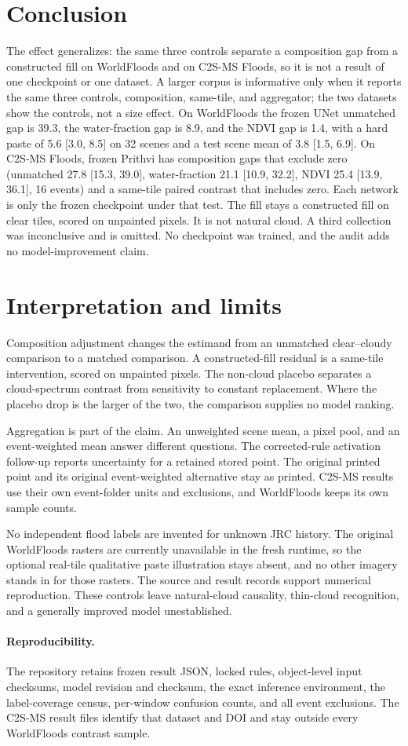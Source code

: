 \section{Conclusion}
The effect generalizes: the same three controls separate a composition gap from a constructed fill on WorldFloods and on C2S-MS Floods, so it is not a result of one checkpoint or one dataset.
A larger corpus is informative only when it reports the same three controls, composition, same-tile, and aggregator; the two datasets show the controls, not a size effect.
On WorldFloods the frozen UNet unmatched gap is 39.3, the water-fraction gap is 8.9, and the NDVI gap is 1.4, with a hard paste of 5.6 [3.0, 8.5] on 32 scenes and a test scene mean of 3.8 [1.5, 6.9].
On C2S-MS Floods, frozen Prithvi has composition gaps that exclude zero (unmatched 27.8 [15.3, 39.0], water-fraction 21.1 [10.9, 32.2], NDVI 25.4 [13.9, 36.1], 16 events) and a same-tile paired contrast that includes zero.
Each network is only the frozen checkpoint under that test.
The fill stays a constructed fill on clear tiles, scored on unpainted pixels.
It is not natural cloud.
A third collection was inconclusive and is omitted.
No checkpoint was trained, and the audit adds no model-improvement claim.

\section{Interpretation and limits}
Composition adjustment changes the estimand from an unmatched clear--cloudy comparison to a matched comparison.
A constructed-fill residual is a same-tile intervention, scored on unpainted pixels.
The non-cloud placebo separates a cloud-spectrum contrast from sensitivity to constant replacement.
Where the placebo drop is the larger of the two, the comparison supplies no model ranking.

Aggregation is part of the claim.
An unweighted scene mean, a pixel pool, and an event-weighted mean answer different questions.
The corrected-rule activation follow-up reports uncertainty for a retained stored point.
The original printed point and its original event-weighted alternative stay as printed.
C2S-MS results use their own event-folder units and exclusions, and WorldFloods keeps its own sample counts.

No independent flood labels are invented for unknown JRC history.
The original WorldFloods rasters are currently unavailable in the fresh runtime, so the optional real-tile qualitative paste illustration stays absent, and no other imagery stands in for those rasters.
The source and result records support numerical reproduction.
These controls leave natural-cloud causality, thin-cloud recognition, and a generally improved model unestablished.

\paragraph{Reproducibility.}
The repository retains frozen result JSON, locked rules, object-level input checksums, model revision and checksum, the exact inference environment, the label-coverage census, per-window confusion counts, and all event exclusions.
The C2S-MS result files identify that dataset and DOI and stay outside every WorldFloods contrast sample.
